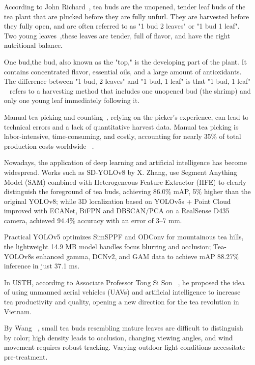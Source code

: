 \documentclass[a4paper,12pt]{report}
\begin{document}
According to  John Richard~\cite{TeaHeeBuds}, tea buds are the unopened, tender leaf buds of the tea plant that are plucked before they are fully unfurl. 
They are harvested before they fully open, and are often referred to as "1 bud 2 leaves" or "1 bud 1 leaf". Two young leaves~\cite{TwoLeavesSymbol},these leaves are tender, full of flavor, and have the right nutritional balance.

One bud,the bud, also known as the "top," is the developing part of the plant. It contains concentrated flavor, essential oils, and a large amount of antioxidants. The difference between "1 bud, 2 leaves" and "1 bud, 1 leaf" is that "1 bud, 1 leaf" ~\cite{ILOTATea} refers to a harvesting method that includes one unopened bud (the shrimp) and only one young leaf immediately following it.

Manual tea picking and counting~\cite{VietGAPTea}, relying on the picker's experience, can lead to technical errors and a lack of quantitative harvest data. Manual tea picking is labor-intensive, time-consuming, and costly, accounting for nearly 35\% of total production costs worldwide ~\cite{ArogyaTea}.

Nowadays, the application of deep learning and artificial intelligence has become widespread. Works such as SD-YOLOv8 by X. Zhang, \cite{Zhang2025} use Segment Anything Model (SAM) combined with Heterogeneous Feature Extractor (HFE) to clearly distinguish the foreground of tea buds, achieving 86.0\% mAP, 5\% higher than the original YOLOv8; while 3D localization based on YOLOv5s + Point Cloud \cite{Zhu2023} improved with ECANet, BiFPN and DBSCAN/PCA on a RealSense D435 camera, achieved 94.4\% accuracy with an error of 3--7 mm. 

Practical YOLOv5 \cite{Li2024} optimizes SimSPPF and ODConv for mountainous tea hills, the lightweight 14.9 MB model handles focus blurring and occlusion; Tea-YOLOv8s \cite{Xie2023} enhanced gamma, DCNv2, and GAM data to achieve mAP 88.27\% inference in just 37.1 ms.

In USTH, according to Associate Professor Tong Si Son ~\cite{USTHUAV2026}, he proposed the idea of using unmanned aerial vehicles (UAVs) and artificial intelligence to increase tea productivity and quality, opening a new direction for the tea revolution in Vietnam.

By Wang ~\cite{Wang2024}, small tea buds resembling mature leaves are difficult to distinguish by color; high density leads to occlusion, changing viewing angles, and wind movement requires robust tracking. Varying outdoor light conditions necessitate pre-treatment.
\end{document}
